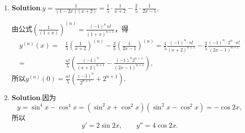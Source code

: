 \documentclass[../main.tex]{subfiles}
\begin{document}
\begin{enumerate}
    \item \textbf{Solution}.$y=\frac{1}{(1-2x)(x+2)}=\frac{1}{5}\cdot\frac{1}{x+2}
              -\frac{2}{5}\cdot\frac{1}{2x-1}$.

          由公式$\left(\frac{1}{(1+x)}\right)^{(n)}=\frac{(-1)^{n}\,n!}{(1+x)^{n+1}}$，得
          \[
              \begin{aligned}
                  y^{(n)}(x)= {} & \frac{1}{5}\left(\frac{1}{x+2}\right)^{(n)}-\frac{2}{5}\left(\frac{1}{2x-1}\right)^{(n)}=\frac{1}{5}\frac{(-1)^n\cdot n!}{(x+2)^{n+1}}-\frac{2}{5}\frac{(-1)^n\cdot2^n\cdot n!}{(2x-1)^{n+1}} \\
                  = {}           & \frac{n!}{5}\left(\frac{(-1)^n}{(x+2)^{n+1}}-\frac{(-1)^n2^{n+1}}{(2x-1)^{n+1}}\right),
              \end{aligned}
          \]
          所以$y^{(n)}(0)=\frac{n!}{5}\left(\frac{(-1)^{n}}{2^{n+1}}+2^{n+1}\right)$.

    \item \textbf{Solution}.因为
          \[
              y=\sin^{4} x-\cos^{4} x=(\sin^{2} x+\cos^{2} x)(\sin^{2} x-\cos^{2} x)=-\cos 2x,
          \]
          所以
          \[
              y'=2\sin 2x,\qquad y''= 4\cos 2x.
          \]
\end{enumerate}
\end{document}
